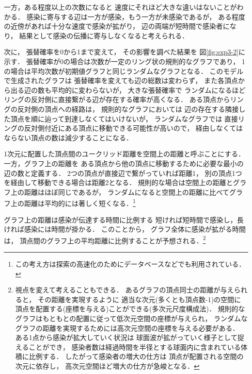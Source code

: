 \documentclass[10pt,oneside]{scrartcl}
\begin{document}
一方，ある程度以上の次数になると
速度にそれほど大きな違いはないことがわかる．
感染に寄与する辺は一方が感染，もう一方が未感染であるが，
ある程度の近傍があれば十分な速度で感染が拡がり，
辺の両端が短時間で感染者になり，
結果として感染の伝播に寄与しなくなると考えられる．

\begin{figure*}%
  \centering
\end{figure*}

次に，
張替確率を0から1まで変えて，
その影響を調べた結果を
図\ref{fig:exp3-2}に示す．
張替確率が0の場合は次数が一定のリング状の規則的なグラフであり，
1の場合は平均次数が初期値グラフと同じランダムなグラフとなる．
このモデルで生成されたグラフは
張替確率を変えても辺の総数は変わらず，
また各頂点から出る辺の数も平均的に変わらないが，
大きな張替確率で
ランダムになるほどリングの反対側に直接繋がる辺が存在する確率が高くなる．
ある頂点からリングの反対側の頂点への経路は，
規則的なグラフにおいては
辺の存在する隣接した頂点を順に辿って到達しなくてはいけないが，
ランダムなグラフでは
直接リングの反対側付近にある頂点に移動できる可能性が高いので，
経由しなくてはならない頂点の数は減少することになる．

1次元に配置した頂点間のユークリッド距離を空間上の距離と呼ぶことにする．
一方，グラフ上の距離を
ある頂点から他の頂点に移動するために必要な最小の辺の数と定義する．
2つの頂点が直接辺で繋がっていれば距離1，
別の頂点1つを経由して移動できる場合は距離2となる．
規則的な場合は空間上の距離とグラフ上の距離はほぼ同じであるが，
ランダムになると空間上の距離に比べてグラフ上の距離は平均的には著しく短くなる．\footnote{この考え方は探索の高速化のためにデータベースなどでも利用されている．}

グラフ上の距離は感染が伝達する時間に比例する
短ければ短時間で感染し，長ければ感染には時間が掛かる．
このことから，
グラフ全体に感染が拡がる時間は，
頂点間のグラフ上の平均距離に比例することが予想される．\footnote{視点を変えて考えることもできる．
あるグラフの頂点同士の距離が与えられると，
その距離を実現するように
適当な次元(多くとも頂点数-1)の空間に
頂点を配置する(座標を与える)ことができる(多次元尺度構成法)．
規則的なグラフはもともとの配置に従って低次元空間の座標が与えられ，
ランダムなグラフの距離を実現するためには高次元空間の座標を与える必要がある．
ある1点から感染が拡大していく状況は
球面波が拡がっていく様子として捉えることができ，
感染者数は経過時間を半径とする球面内に含まれている体積に比例する．
したがって感染者の増大の仕方は
頂点が配置される空間の次元に依存し，
高次元空間ほど増大の仕方が急峻となる．}
\end{document}
